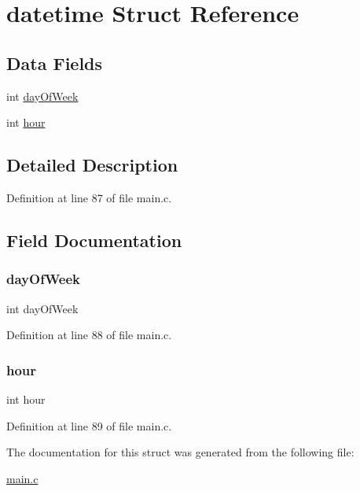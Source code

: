 \hypertarget{structdatetime}{}\section{datetime Struct Reference}
\label{structdatetime}
\subsection*{Data Fields}
\begin{DoxyCompactItemize}
\item 
int \hyperlink{structdatetime_aaee8803c7ec30f625d6802f2a82ca05c}{day\+Of\+Week}
\item 
int \hyperlink{structdatetime_a15df9ba285cfd842f284025f904edc9c}{hour}
\end{DoxyCompactItemize}


\subsection{Detailed Description}


Definition at line 87 of file main.\+c.



\subsection{Field Documentation}
\hypertarget{structdatetime_aaee8803c7ec30f625d6802f2a82ca05c}{}\label{structdatetime_aaee8803c7ec30f625d6802f2a82ca05c} 
\subsubsection{\texorpdfstring{day\+Of\+Week}{dayOfWeek}}
{\footnotesize\ttfamily int day\+Of\+Week}



Definition at line 88 of file main.\+c.

\hypertarget{structdatetime_a15df9ba285cfd842f284025f904edc9c}{}\label{structdatetime_a15df9ba285cfd842f284025f904edc9c} 
\subsubsection{\texorpdfstring{hour}{hour}}
{\footnotesize\ttfamily int hour}



Definition at line 89 of file main.\+c.



The documentation for this struct was generated from the following file\+:\begin{DoxyCompactItemize}
\item 
\hyperlink{main_8c}{main.\+c}\end{DoxyCompactItemize}
